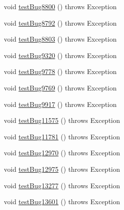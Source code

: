 \begin{DoxyCompactItemize}
\item 
void \mbox{\hyperlink{classtestsuite_1_1regression_1_1_meta_data_regression_test_a348ef415a6528252b8b3db3a8af6e3d9}{test\+Bug8800}} ()  throws Exception 
\item 
void \mbox{\hyperlink{classtestsuite_1_1regression_1_1_meta_data_regression_test_ac05ecaf65c43b94713d2dc0ab3430a94}{test\+Bug8792}} ()  throws Exception 
\item 
void \mbox{\hyperlink{classtestsuite_1_1regression_1_1_meta_data_regression_test_a2f5b71ea6cea2579da1f5fd73cd93227}{test\+Bug8803}} ()  throws Exception 
\item 
void \mbox{\hyperlink{classtestsuite_1_1regression_1_1_meta_data_regression_test_a85b0332eeddf0448a8813e9e572be277}{test\+Bug9320}} ()  throws Exception 
\item 
void \mbox{\hyperlink{classtestsuite_1_1regression_1_1_meta_data_regression_test_a0cb82d7f4b575ebc9da191ff69ab222c}{test\+Bug9778}} ()  throws Exception 
\item 
void \mbox{\hyperlink{classtestsuite_1_1regression_1_1_meta_data_regression_test_aaeda7a5f9b968ba3bb866fb2fb62b75c}{test\+Bug9769}} ()  throws Exception 
\item 
void \mbox{\hyperlink{classtestsuite_1_1regression_1_1_meta_data_regression_test_a091172fd69f6c74846e6d1d59d889924}{test\+Bug9917}} ()  throws Exception 
\item 
void \mbox{\hyperlink{classtestsuite_1_1regression_1_1_meta_data_regression_test_a38b9ca5721854ae691f540ccda51593e}{test\+Bug11575}} ()  throws Exception 
\item 
void \mbox{\hyperlink{classtestsuite_1_1regression_1_1_meta_data_regression_test_a3f114c46c9a6eba1998830d138edeaf5}{test\+Bug11781}} ()  throws Exception 
\item 
void \mbox{\hyperlink{classtestsuite_1_1regression_1_1_meta_data_regression_test_a90992a3b409d173b89d677edbc407433}{test\+Bug12970}} ()  throws Exception 
\item 
void \mbox{\hyperlink{classtestsuite_1_1regression_1_1_meta_data_regression_test_ad4507d03539b3dcb6640da83424031e7}{test\+Bug12975}} ()  throws Exception 
\item 
void \mbox{\hyperlink{classtestsuite_1_1regression_1_1_meta_data_regression_test_a0c675c284ad20892d31732b73f09e7c6}{test\+Bug13277}} ()  throws Exception 
\item 
void \mbox{\hyperlink{classtestsuite_1_1regression_1_1_meta_data_regression_test_a9f064453a9a5087f0e60300320e2f041}{test\+Bug13601}} ()  throws Exception 

\end{DoxyCompactItemize}
